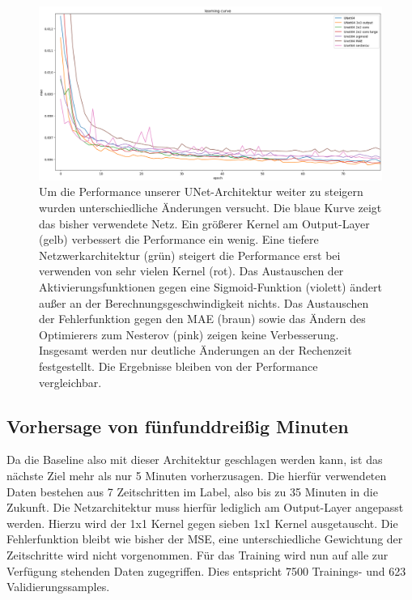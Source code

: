 \begin{figure}[h]
	\centering
	\includegraphics[width=\linewidth]{pics/vgl_lc_optim.png}
	\caption[Verschiedene UNet-Optimierungen im Vergleich]{Um die Performance unserer UNet-Architektur weiter zu steigern wurden unterschiedliche Änderungen versucht. Die blaue Kurve zeigt das bisher verwendete Netz. Ein größerer Kernel am Output-Layer (gelb) verbessert die Performance ein wenig. Eine tiefere Netzwerkarchitektur (grün) steigert die Performance erst bei verwenden von sehr vielen Kernel (rot). Das Austauschen der Aktivierungsfunktionen gegen eine Sigmoid-Funktion (violett) ändert außer an der Berechnungsgeschwindigkeit nichts. Das Austauschen der Fehlerfunktion gegen den MAE (braun) sowie das Ändern des Optimierers zum Nesterov (pink) zeigen keine Verbesserung. Insgesamt werden nur deutliche Änderungen an der Rechenzeit festgestellt. Die Ergebnisse bleiben von der Performance vergleichbar.}
	\label{lc_unet_types}
\end{figure}

\subsection{Vorhersage von fünfunddreißig Minuten}
Da die Baseline also mit dieser Architektur geschlagen werden kann, ist das nächste Ziel mehr als nur 5 Minuten vorherzusagen. Die hierfür verwendeten Daten bestehen aus 7 Zeitschritten im Label, also bis zu 35 Minuten in die Zukunft. Die Netzarchitektur muss hierfür lediglich am Output-Layer angepasst werden. Hierzu wird der 1x1 Kernel gegen sieben 1x1 Kernel ausgetauscht. Die Fehlerfunktion bleibt wie bisher der MSE, eine unterschiedliche Gewichtung der Zeitschritte wird nicht vorgenommen.
Für das Training wird nun auf alle zur Verfügung stehenden Daten zugegriffen. Dies entspricht 7500 Trainings- und 623 Validierungssamples.

